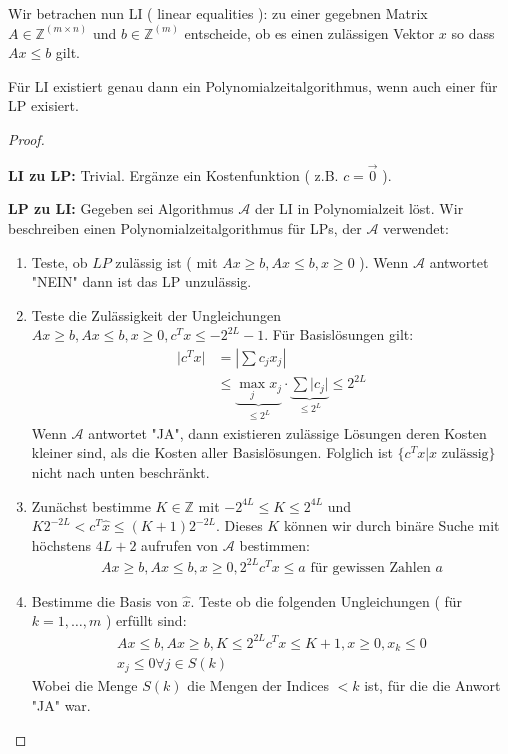 Wir betrachen nun LI ( linear equalities ): zu einer gegebnen Matrix $A \in \mathbb Z^(m\times n)$ und $b \in \mathbb Z^(m)$ entscheide, ob es einen zulässigen Vektor $x$ so dass $Ax \leq b$ gilt.
\begin{theorem}
Für LI existiert genau dann ein Polynomialzeitalgorithmus, wenn auch einer für LP exisiert.
\end{theorem}
\begin{proof}
\begin{description}
\item\textbf{LI zu LP:} Trivial. Ergänze ein Kostenfunktion ( z.B. $c = \vec{0}$ ).
\item\textbf{LP zu LI:} Gegeben sei Algorithmus $\mathcal A$ der LI in Polynomialzeit löst. Wir beschreiben einen Polynomialzeitalgorithmus für LPs, der $\mathcal A$ verwendet:
\begin{enumerate}
	\item Teste, ob $LP$ zulässig  ist ( mit $Ax \geq b, Ax \leq b, x \geq 0$ ). Wenn $\mathcal A$ antwortet "NEIN" dann ist das LP unzulässig.
	\item Teste die Zulässigkeit der Ungleichungen $Ax \geq b, Ax\leq b, x \geq 0, c^Tx \leq -2^{2L} -1$. Für Basislösungen gilt:
\begin{align*}
 \lvert c^Tx\rvert &= \left \lvert \sum c_j x_j \right \rvert \\
	&\leq \underbrace{\max_j x_j}_{\leq 2^L} \cdot \underbrace{\sum \lvert c_j \rvert}_{\leq 2^L} \leq 2^{2L}
\end{align*}
		Wenn $\mathcal A$ antwortet "JA", dann existieren zulässige Lösungen deren Kosten kleiner sind, als die Kosten aller Basislösungen. Folglich ist $\{ c^Tx | x \text{ zulässig} \}$ nicht nach unten beschränkt.
	\item Zunächst bestimme $K \in \mathbb Z$ mit $-2^{4L} \leq K \leq 2^{4L}$ und $K 2^{-2L} < c^T\hat{x} \leq (K+1) 2^{-2L}$.
Dieses $K$ können wir durch binäre Suche mit höchstens $4L +2$ aufrufen von $\mathcal A$ bestimmen:
\begin{align*}
	Ax \geq b, Ax \leq b, x\geq 0, 2^{2L}c^Tx \leq a \text{ für gewissen Zahlen }a
\end{align*}
	\item Bestimme die Basis von $\hat{x}$. Teste ob die folgenden Ungleichungen ( für $k = 1,\dotsc,m$ ) erfüllt sind:
\begin{align*}
Ax \leq b, Ax \geq b , K \leq 2^{2L} c^Tx \leq K+1, x \geq 0, x_k \leq 0 \\
x_j \leq 0 \forall j \in S(k)
\end{align*}
Wobei die Menge $S(k)$ die Mengen der Indices $< k$ ist, für die die Anwort "JA" war.
\end{enumerate}
\end{description}
\end{proof}
